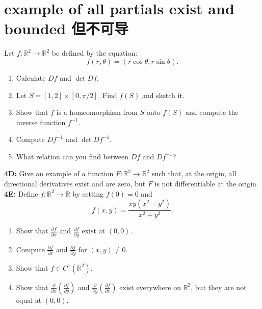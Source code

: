 \documentclass[lang=cn,11pt]{template}
\begin{document}
\section{example of all partials exist and bounded 但不可导}
Let \( f : \mathbb{R}^2 \to \mathbb{R}^2 \) be defined by the equation:
\[
f(r, \theta) = (r \cos \theta, r \sin \theta).
\]
\begin{enumerate}
    \item Calculate \( Df \) and \( \det Df \).
    \item Let \( S = [1, 2] \times [0, \pi/2] \). Find \( f(S) \) and sketch it.
    \item Show that \( f \) is a homeomorphism from \( S \) onto \( f(S) \) and compute the inverse function \( f^{-1} \).
    \item Compute \( Df^{-1} \) and \( \det Df^{-1} \).
    \item What relation can you find between \( Df \) and \( Df^{-1} \)?
\end{enumerate}

\noindent\textbf{4D: }
Give an example of a function \( F : \mathbb{R}^2 \to \mathbb{R}^2 \) such that, at the origin, all directional derivatives exist and are zero, but \( F \) is not differentiable at the origin.\\

\noindent\textbf{4E: }
Define \( f : \mathbb{R}^2 \to \mathbb{R} \) by setting \( f(0) = 0 \) and
\[
f(x, y) = \frac{xy(x^2 - y^2)}{x^2 + y^2}.
\]
\begin{enumerate}
    \item Show that \( \frac{\partial f}{\partial x} \) and \( \frac{\partial f}{\partial y} \) exist at \( (0, 0) \).
    \item Compute \( \frac{\partial f}{\partial x} \) and \( \frac{\partial f}{\partial y} \) for \( (x, y) \neq 0 \).
    \item Show that \( f \in C^1(\mathbb{R}^2) \).
    \item Show that \( \frac{\partial}{\partial x} \left( \frac{\partial f}{\partial y} \right) \) and \( \frac{\partial}{\partial y} \left( \frac{\partial f}{\partial x} \right) \) exist everywhere on \( \mathbb{R}^2 \), but they are not equal at \( (0, 0) \).
\end{enumerate}
\end{document}
